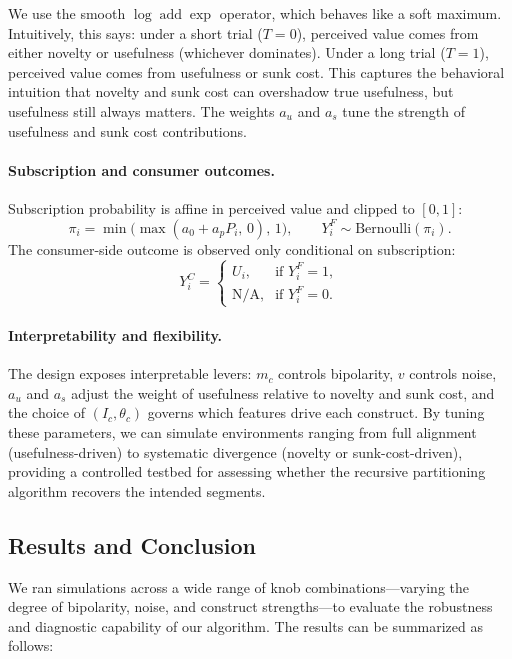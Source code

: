 \documentclass[11pt,letterpaper,english]{article}
\begin{document}
We use the smooth $\log\!\operatorname{add}\exp$ operator, which behaves like a soft maximum. Intuitively, this says: under a short trial ($T=0$), perceived value comes from either novelty or usefulness (whichever dominates). Under a long trial ($T=1$), perceived value comes from usefulness or sunk cost. This captures the behavioral intuition that novelty and sunk cost can overshadow true usefulness, but usefulness still always matters. The weights $a_u$ and $a_s$ tune the strength of usefulness and sunk cost contributions.

\paragraph{Subscription and consumer outcomes.}
Subscription probability is affine in perceived value and clipped to $[0,1]$:
\[
\pi_i = \min\!\big(\max(a_0 + a_p P_i,\,0),\,1\big), 
\qquad
Y_i^F \sim \text{Bernoulli}(\pi_i).
\]
The consumer-side outcome is observed only conditional on subscription:
\[
Y_i^C = 
\begin{cases}
U_i, & \text{if } Y_i^F = 1,\\
\text{N/A}, & \text{if } Y_i^F = 0.
\end{cases}
\]

\paragraph{Interpretability and flexibility.}
The design exposes interpretable levers: $m_c$ controls bipolarity, $v$ controls noise, $a_u$ and $a_s$ adjust the weight of usefulness relative to novelty and sunk cost, and the choice of $(I_c,\theta_c)$ governs which features drive each construct. By tuning these parameters, we can simulate environments ranging from full alignment (usefulness-driven) to systematic divergence (novelty or sunk-cost-driven), providing a controlled testbed for assessing whether the recursive partitioning algorithm recovers the intended segments.


\subsection{Results and Conclusion}
\label{sec:results}

We ran simulations across a wide range of knob combinations---varying the degree of bipolarity, noise, and construct strengths---to evaluate the robustness and diagnostic capability of our algorithm. The results can be summarized as follows:
\end{document}
